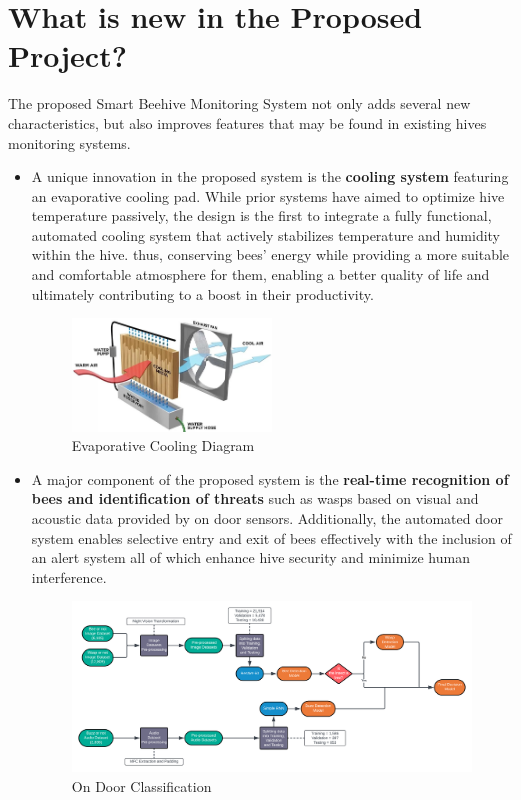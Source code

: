 \documentclass[12pt]{article}
\begin{document}
	\section{What is new in the Proposed Project?}
	The proposed Smart Beehive Monitoring System not only adds several new characteristics, but also improves features that may be found in existing hives monitoring systems. \\
	\begin{itemize}
		\item A unique innovation in the proposed system is the \textbf{cooling system} featuring an evaporative cooling pad. While prior systems have aimed to optimize hive temperature passively, the design is the first to integrate a fully functional, automated cooling system that actively stabilizes temperature and humidity within the hive. thus, conserving bees' energy while providing a more suitable and comfortable atmosphere  for them, enabling a better quality of life and ultimately contributing to a boost in their productivity. \\
		\begin{figure}[H]
			\centering
			\includegraphics[width=0.5\textwidth]{Images/swamp-cooler-diagram.jpg}
			\caption{Evaporative Cooling Diagram \cite{powerbreezer2021}}
			\label{fig:EVAPORATIVE_COOLER}
		\end{figure}
		
		\item A major component of the proposed system is the \textbf{real-time recognition of bees and identification of threats} such as wasps based on visual and acoustic data provided by on door sensors. Additionally, the automated door system enables selective entry and exit of bees effectively with the inclusion of an alert system all of which enhance hive security and minimize human interference.
		\begin{figure}[H]
			\centering
			\includegraphics[width=\textwidth]{Images/Pipelines/On Door Classifier Pipeline Diagram.png}
			\caption{On Door Classification}
			\label{fig:DOOR_CLASSIFICATION}
						\vspace{2 cm}
		\end{figure}
	\end{itemize}
\end{document}
